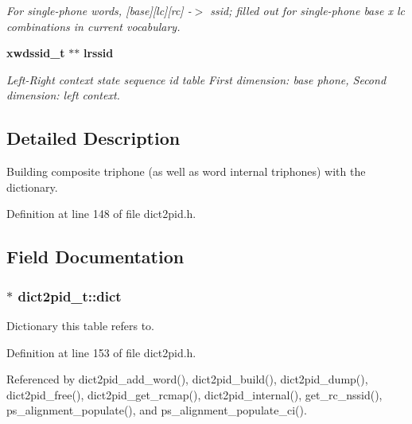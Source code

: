\begin{DoxyCompactItemize}
\begin{DoxyCompactList}\small\item\em For single-\/phone words, [base][lc][rc] -\/$>$ ssid; filled out for single-\/phone base x lc combinations in current vocabulary. \end{DoxyCompactList}\item 
{\bf xwdssid\-\_\-t} $\ast$$\ast$ {\bf lrssid}\label{structdict2pid__t_a6c1de8a269f6ff37dce3dd8cbec4235a}

\begin{DoxyCompactList}\small\item\em Left-\/\-Right context state sequence id table First dimension\-: base phone, Second dimension\-: left context. \end{DoxyCompactList}\end{DoxyCompactItemize}


\subsection{Detailed Description}
Building composite triphone (as well as word internal triphones) with the dictionary. 

Definition at line 148 of file dict2pid.\-h.



\subsection{Field Documentation}
\subsubsection[{dict}]{$\ast$ dict2pid\-\_\-t\-::dict}\label{structdict2pid__t_ae1fecad64884980e9d8355844abc3512}


Dictionary this table refers to. 



Definition at line 153 of file dict2pid.\-h.



Referenced by dict2pid\-\_\-add\-\_\-word(), dict2pid\-\_\-build(), dict2pid\-\_\-dump(), dict2pid\-\_\-free(), dict2pid\-\_\-get\-\_\-rcmap(), dict2pid\-\_\-internal(), get\-\_\-rc\-\_\-nssid(), ps\-\_\-alignment\-\_\-populate(), and ps\-\_\-alignment\-\_\-populate\-\_\-ci().

